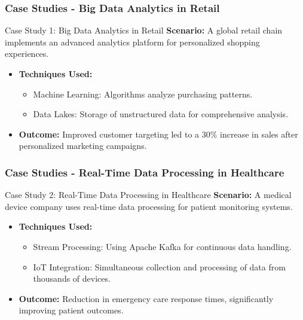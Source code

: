 \documentclass[aspectratio=169]{beamer}
\begin{document}
\begin{frame}[fragile]
    \frametitle{Case Studies - Big Data Analytics in Retail}
    \begin{block}{Case Study 1: Big Data Analytics in Retail}
        \textbf{Scenario:} A global retail chain implements an advanced analytics platform for personalized shopping experiences.
        \begin{itemize}
            \item \textbf{Techniques Used:}
            \begin{itemize}
                \item Machine Learning: Algorithms analyze purchasing patterns.
                \item Data Lakes: Storage of unstructured data for comprehensive analysis.
            \end{itemize}
            \item \textbf{Outcome:} Improved customer targeting led to a 30\% increase in sales after personalized marketing campaigns.
        \end{itemize}
    \end{block}
\end{frame}

\begin{frame}[fragile]
    \frametitle{Case Studies - Real-Time Data Processing in Healthcare}
    \begin{block}{Case Study 2: Real-Time Data Processing in Healthcare}
        \textbf{Scenario:} A medical device company uses real-time data processing for patient monitoring systems.
        \begin{itemize}
            \item \textbf{Techniques Used:}
            \begin{itemize}
                \item Stream Processing: Using Apache Kafka for continuous data handling.
                \item IoT Integration: Simultaneous collection and processing of data from thousands of devices.
            \end{itemize}
            \item \textbf{Outcome:} Reduction in emergency care response times, significantly improving patient outcomes.
        \end{itemize}
    \end{block}
\end{frame}
\end{document}
